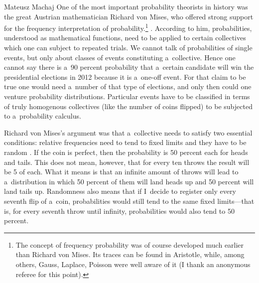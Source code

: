 \begin{artengenv}{Mateusz Machaj}
One of the most important probability theorists in history was the great Austrian mathematician Richard von Mises, who offered strong support for the frequency interpretation of probability.\footnote{The concept of frequency probability was of course developed much earlier than Richard von Mises. Its traces can be found in Aristotle, while, among others, Gauss, Laplace, Poisson were well aware of it (I thank an anonymous referee for this point).} 
\parencites[Modern, mainstream axiomatic foundations were built by Andrey Kolmogorov; see][pp.17–18]{howson_theories_1995}. %
 According to him, probabilities, understood as mathematical functions, need to be applied to certain collectives which one can subject to repeated trials. We cannot talk of probabilities of single events, but only about classes of events constituting a~collective. Hence one cannot say there is a~90 percent probability that a~certain candidate will win the presidential elections in 2012 because it is a~one-off event. For that claim to be true one would need a~number of that type of elections, and only then could one venture probability distributions. Particular events have to be classified in terms of truly homogenous collectives (like the number of coins flipped) to be subjected to a~probability calculus.



Richard von Mises's argument was that a~collective needs to satisfy two essential conditions: relative frequencies need to tend to fixed limits and they have to be random 
\parencite[][pp.28–29]{mises_probability_1957}. %
 If the coin is perfect, then the probability is 50 percent each for heads and tails. This does not mean, however, that for every ten throws the result will be 5 of each. What it means is that an infinite amount of throws will lead to a~distribution in which 50 percent of them will land heads up and 50 percent will land tails up. Randomness also means that if I~decide to register only every seventh flip of a~coin, probabilities would still tend to the same fixed limits---that is, for every seventh throw until infinity, probabilities would also tend to 50 percent.




\end{artengenv}
